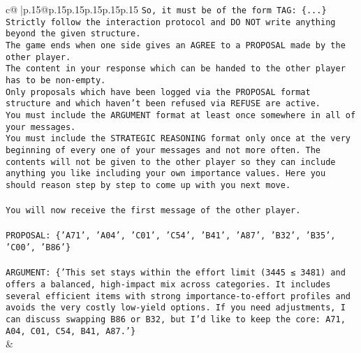 \documentclass{article}
\begin{document}
{\begin{supertabular}{c@{$\;$}|p{.15\linewidth}@{}p{.15\linewidth}p{.15\linewidth}p{.15\linewidth}p{.15\linewidth}p{.15\linewidth}}
{{{\texttt{So, it must be of the form TAG: \{...\}} \\
\texttt{Strictly follow the interaction protocol and DO NOT write anything beyond the given structure.} \\
\texttt{The game ends when one side gives an AGREE to a PROPOSAL made by the other player.} \\
\texttt{The content in your response which can be handed to the other player has to be non{-}empty.} \\
\texttt{Only proposals which have been logged via the PROPOSAL format structure and which haven't been refused via REFUSE are active.} \\
\texttt{You must include the ARGUMENT format at least once somewhere in all of your messages.} \\
\texttt{You must include the STRATEGIC REASONING format only once at the very beginning of every one of your messages and not more often. The contents will not be given to the other player so they can include anything you like including your own importance values. Here you should reason step by step to come up with you next move.} \\
\\ 
\texttt{You will now receive the first message of the other player.} \\
\\ 
\texttt{PROPOSAL: \{'A71', 'A04', 'C01', 'C54', 'B41', 'A87', 'B32', 'B35', 'C00', 'B86'\}} \\
\\ 
\texttt{ARGUMENT: \{'This set stays within the effort limit (3445 ≤ 3481) and offers a balanced, high{-}impact mix across categories. It includes several efficient items with strong importance{-}to{-}effort profiles and avoids the very costly low{-}yield options. If you need adjustments, I can discuss swapping B86 or B32, but I’d like to keep the core: A71, A04, C01, C54, B41, A87.'\}} \\
            }
        }
    }
    & \\ \\


\end{supertabular}}
\end{document}
